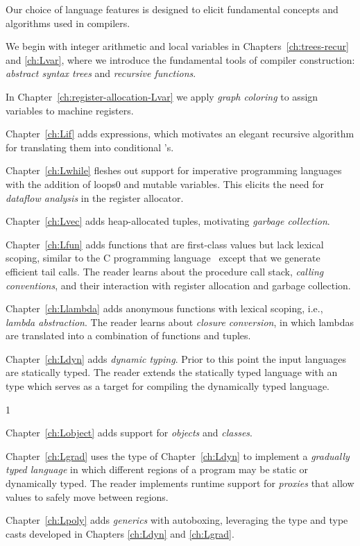\documentclass[7x10,nocrop]{TimesAPriori_MIT}%
\def\racketEd{0}
\def\pythonEd{1}
\def\edition{1}
\newcommand{\racket}[1]{{\if\edition\racketEd{#1}\fi}}
\begin{document}
Our choice of language features is designed to elicit fundamental
concepts and algorithms used in compilers.
\begin{itemize}
\item We begin with integer arithmetic and local variables in
  Chapters~\ref{ch:trees-recur} and \ref{ch:Lvar}, where we introduce
  the fundamental tools of compiler construction: \emph{abstract
    syntax trees} and \emph{recursive functions}. 
\item In Chapter~\ref{ch:register-allocation-Lvar} we apply
  \emph{graph coloring} to assign variables to machine registers.
\item Chapter~\ref{ch:Lif} adds  expressions, which motivates
  an elegant recursive algorithm for translating them into conditional
  's.
\item Chapter~\ref{ch:Lwhile} fleshes out support for imperative
  programming languages with the addition of loops\racket{ and mutable
  variables}. This elicits the need for \emph{dataflow
    analysis} in the register allocator.
\item Chapter~\ref{ch:Lvec} adds heap-allocated tuples, motivating
  \emph{garbage collection}.
\item Chapter~\ref{ch:Lfun} adds functions that are first-class values
  but lack lexical scoping, similar to the C programming
  language~\citep{Kernighan:1988nx} except that we generate efficient
  tail calls. The reader learns about the procedure call stack,
  \emph{calling conventions}, and their interaction with register
  allocation and garbage collection.
\item Chapter~\ref{ch:Llambda} adds anonymous functions with lexical
  scoping, i.e., \emph{lambda abstraction}. The reader learns about
  \emph{closure conversion}, in which lambdas are translated into a
  combination of functions and tuples.
\item Chapter~\ref{ch:Ldyn} adds \emph{dynamic typing}. Prior to this
  point the input languages are statically typed.  The reader extends
  the statically typed language with an  type which serves
  as a target for compiling the dynamically typed language.
{\if\edition\pythonEd
\item Chapter~\ref{ch:Lobject} adds support for \emph{objects} and
  \emph{classes}.
\fi}
\item Chapter~\ref{ch:Lgrad} uses the  type of
  Chapter~\ref{ch:Ldyn} to implement a \emph{gradually typed language}
  in which different regions of a program may be static or dynamically
  typed. The reader implements runtime support for \emph{proxies} that
  allow values to safely move between regions.
\item Chapter~\ref{ch:Lpoly} adds \emph{generics} with autoboxing,
  leveraging the  type and type casts developed in Chapters
  \ref{ch:Ldyn} and \ref{ch:Lgrad}.
\end{itemize}
\end{document}
